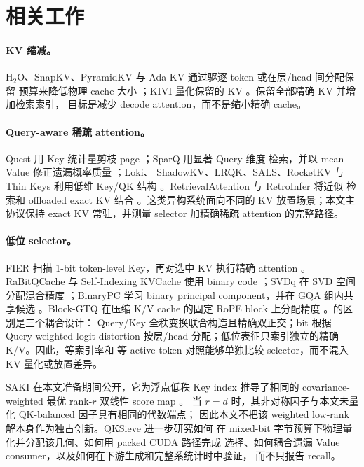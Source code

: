 \section{相关工作}
\label{sec:related}

\paragraph{KV 缩减。}
H$_2$O、SnapKV、PyramidKV 与 Ada-KV 通过驱逐 token 或在层/head 间分配保留
预算来降低物理 cache 大小
\citep{zhang2023h2o,li2024snapkv,cai2024pyramidkv,feng2024adakv}；KIVI
量化保留的 KV \citep{liu2024kivi}。\method 保留全部精确 KV 并增加检索索引，
目标是减少 decode attention，而不是缩小精确 cache。

\paragraph{Query-aware 稀疏 attention。}
Quest 用 Key 统计量剪枝 page \citep{tang2024quest}；SparQ 用显著 Query 维度
检索，并以 mean Value 修正遗漏概率质量 \citep{ribar2023sparq}；Loki、
ShadowKV、LRQK、SALS、RocketKV 与 Thin Keys 利用低维 Key/QK 结构
\citep{singhania2024loki,sun2024shadowkv,li2025lrqk,mu2025sals,
behnam2025rocketkv,yao2026thinkeys}。RetrievalAttention 与 RetroInfer 将近似
检索和 offloaded exact KV 结合
\citep{liu2024retrievalattention,chen2025retroinfer}。这类异构系统面向不同的
KV 放置场景；本文主协议保持 exact KV 常驻，并测量 selector 加精确稀疏
attention 的完整路径。

\paragraph{低位 selector。}
FIER 扫描 1-bit token-level Key，再对选中 KV 执行精确 attention
\citep{wang2025fier}。RaBitQCache 与 Self-Indexing KVCache 使用 binary code
\citep{li2026rabitqcache,yang2026selfindexing}；SVDq 在 SVD 空间分配混合精度
\citep{hong2025svdq}；BinaryPC 学习 binary principal component，并在 GQA
组内共享候选 \citep{yu2026binarypc}。Block-GTQ 在压缩 K/V cache 的固定 RoPE
block 上分配精度 \citep{liang2026blockgtq}。\method 的区别是三个耦合设计：
Query/Key 全秩变换联合构造且精确双正交；bit 根据 Query-weighted logit
distortion 按层/head 分配；低位表征只索引独立的精确 K/V。因此，等索引率和
等 active-token 对照能够单独比较 selector，而不混入 KV 量化或放置差异。

SAKI 在本文准备期间公开，它为浮点低秩 Key index 推导了相同的
covariance-weighted 最优 rank-$r$ 双线性 score map \citep{zhang2026saki}。
当 $r=d$ 时，其非对称因子与本文未量化 QK-balanced 因子具有相同的代数端点；
因此本文不把该 weighted low-rank 解本身作为独占创新。QKSieve 进一步研究如何
在 mixed-bit 字节预算下物理量化并分配该几何、如何用 packed CUDA 路径完成
选择、如何耦合遗漏 Value consumer，以及如何在下游生成和完整系统计时中验证，
而不只报告 recall。

